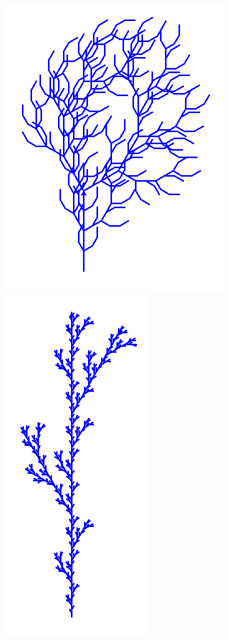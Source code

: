 \documentclass[11pt,class=report,crop=false]{standalone}
\begin{document}
\begin{activite}
\begin{enumerate}
\begin{center}
\includegraphics[scale=\myscale,scale=0.27]{ecran-lsysteme-15}\qquad
\includegraphics[scale=\myscale,scale=0.25]{ecran-lsysteme-16}\qquad

\end{center}
\end{enumerate}
\end{activite}
\end{document}
